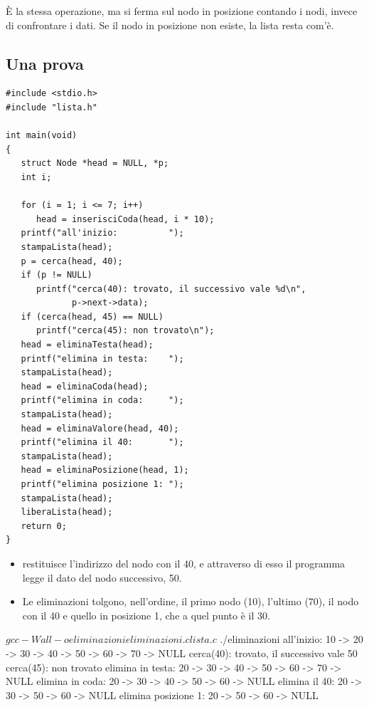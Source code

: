È la stessa operazione, ma  si ferma sul nodo in posizione
 contando i nodi, invece di confrontare i dati. Se il nodo in
posizione  non esiste, la lista resta com'è.

\subsection{Una prova}

\begin{affianco}[0.6][c]
\begin{lstlisting}[style=c, name=eliminazioni.c]
#include <stdio.h>
#include "lista.h"

int main(void)
{
   struct Node *head = NULL, *p;
   int i;

   for (i = 1; i <= 7; i++)
      head = inserisciCoda(head, i * 10);
   printf("all'inizio:          ");
   stampaLista(head);
   p = cerca(head, 40);
   if (p != NULL)
      printf("cerca(40): trovato, il successivo vale %d\n",
             p->next->data);
   if (cerca(head, 45) == NULL)
      printf("cerca(45): non trovato\n");
   head = eliminaTesta(head);
   printf("elimina in testa:    ");
   stampaLista(head);
   head = eliminaCoda(head);
   printf("elimina in coda:     ");
   stampaLista(head);
   head = eliminaValore(head, 40);
   printf("elimina il 40:       ");
   stampaLista(head);
   head = eliminaPosizione(head, 1);
   printf("elimina posizione 1: ");
   stampaLista(head);
   liberaLista(head);
   return 0;
}
\end{lstlisting}
\risultato
\begin{itemize}
  \item {} restituisce l'indirizzo del nodo con il 40,
        e attraverso di esso il programma legge il dato del nodo
        successivo, 50.
  \item Le eliminazioni tolgono, nell'ordine, il primo nodo (10), l'ultimo
        (70), il nodo con il 40 e quello in posizione 1, che a quel punto è
        il 30.
\end{itemize}
\end{affianco}

\begin{console}
$ gcc -Wall -o eliminazioni eliminazioni.c lista.c
$ ./eliminazioni
all'inizio:          10 -> 20 -> 30 -> 40 -> 50 -> 60 -> 70 -> NULL
cerca(40): trovato, il successivo vale 50
cerca(45): non trovato
elimina in testa:    20 -> 30 -> 40 -> 50 -> 60 -> 70 -> NULL
elimina in coda:     20 -> 30 -> 40 -> 50 -> 60 -> NULL
elimina il 40:       20 -> 30 -> 50 -> 60 -> NULL
elimina posizione 1: 20 -> 50 -> 60 -> NULL
\end{console}

